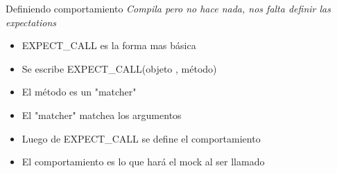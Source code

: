 \begin{frame}[t]{Definiendo comportamiento}
\textit{Compila pero no hace nada, nos falta definir las expectations}
\bigskip
\begin{itemize}
	\item EXPECT\_CALL es la forma mas b\'asica
	\item Se escribe EXPECT\_CALL(objeto \alert{,} m\'etodo)
	\item El m\'etodo es un "matcher"
	\item El "matcher" matchea los argumentos
	\item Luego de EXPECT\_CALL se define el comportamiento
	\item El comportamiento es lo que har\'a el mock al ser llamado
\end{itemize}
\end{frame}



